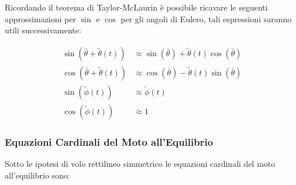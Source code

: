 Ricordando il teorema di Taylor-McLaurin è possibile ricavare le seguenti approssimazioni per $\sin$ e $\cos$ per gli angoli di Eulero, tali espressioni saranno utili successivamente:

\begin{equation}
    \label{eq:EuleroSinCos}
    \begin{split}
        \sin(\bar{\theta} + \widetilde{\theta}(t)) & \approx \sin(\bar{\theta}) + \widetilde{\theta}(t)\cos(\bar{\theta}) \\
        \cos(\bar{\theta} + \widetilde{\theta}(t)) & \approx \cos(\bar{\theta}) - \widetilde{\theta}(t)\sin(\bar{\theta}) \\
        \sin(\widetilde{\phi}(t))                  & \approx \widetilde{\phi}(t)                                          \\
        \cos(\widetilde{\phi}(t))                  & \approx 1
    \end{split}
\end{equation}

\subsubsection{Equazioni Cardinali del Moto all'Equilibrio}

Sotto le ipotesi di volo rettilineo simmetrico le equazioni cardinali del moto all'equilibrio sono:

